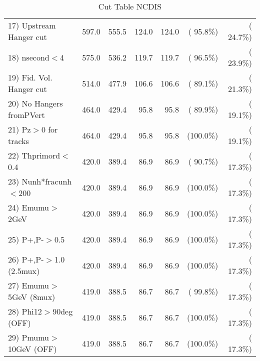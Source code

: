 \begin{table}[h!]
\begin{tabular}{||l||r|r|r|r|r|r||}
 17) Upstream Hanger cut  &        597.0 &        555.5 &        124.0 &        124.0 & ( 95.8\%) & ( 24.7\%) \\
 18) nsecond$<$4          &        575.0 &        536.2 &        119.7 &        119.7 & ( 96.5\%) & ( 23.9\%) \\
 19) Fid. Vol. Hanger cut &        514.0 &        477.9 &        106.6 &        106.6 & ( 89.1\%) & ( 21.3\%) \\
 20) No Hangers fromPVert &        464.0 &        429.4 &         95.8 &         95.8 & ( 89.9\%) & ( 19.1\%) \\
 21) Pz$>$0 for tracks    &        464.0 &        429.4 &         95.8 &         95.8 & (100.0\%) & ( 19.1\%) \\
 22) Thprimord$<$0.4      &        420.0 &        389.4 &         86.9 &         86.9 & ( 90.7\%) & ( 17.3\%) \\
 23) Nunh*fracunh$<$200   &        420.0 &        389.4 &         86.9 &         86.9 & (100.0\%) & ( 17.3\%) \\
 24) Emumu$>$2GeV         &        420.0 &        389.4 &         86.9 &         86.9 & (100.0\%) & ( 17.3\%) \\
 25) P+,P-$>$0.5          &        420.0 &        389.4 &         86.9 &         86.9 & (100.0\%) & ( 17.3\%) \\
 26) P+,P-$>$1.0 (2.5mux) &        420.0 &        389.4 &         86.9 &         86.9 & (100.0\%) & ( 17.3\%) \\
 27) Emumu$>$5GeV  (8mux) &        419.0 &        388.5 &         86.7 &         86.7 & ( 99.8\%) & ( 17.3\%) \\
 28) Phi12$>$90deg  (OFF) &        419.0 &        388.5 &         86.7 &         86.7 & (100.0\%) & ( 17.3\%) \\
 29) Pmumu$>$10GeV  (OFF) &        419.0 &        388.5 &         86.7 &         86.7 & (100.0\%) & ( 17.3\%) \\
 \hline
 \hline
 \end{tabular}
 \caption{Cut Table  NCDIS    }
 \label{tab-cutcohjpsi-mumu_ncdis}
 \end{table}
